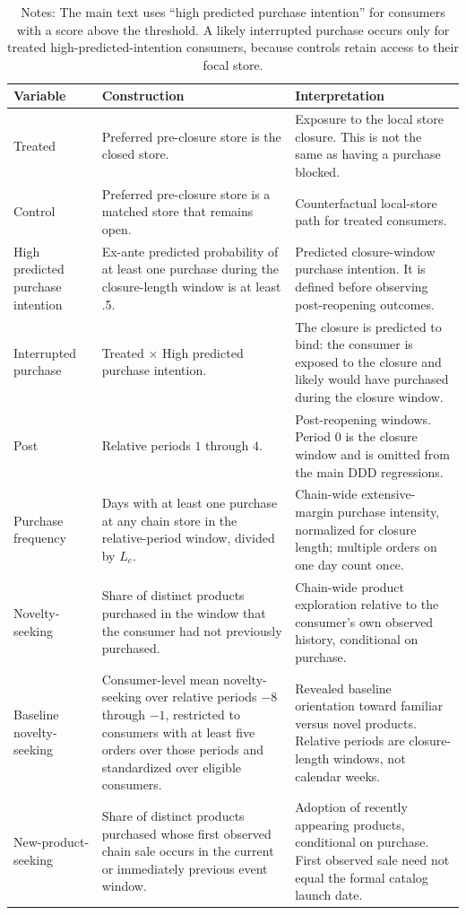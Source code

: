 \documentclass[11 pt]{article}
\newcommand\fnote[1]{\captionsetup{font=footnotesize}\caption*{#1}}
\begin{document}
\begin{table}[!ht]
\centering
\caption{Key variables in the empirical design}
\label{tab:appendix_variable_definitions}
\small
\begin{tabularx}{\textwidth}{p{4cm}p{5.5cm}X}
\toprule
Variable & Construction & Interpretation \\
\midrule
Treated & Preferred pre-closure store is the closed store. & Exposure to the local store closure. This is not the same as having a purchase blocked. \\
Control & Preferred pre-closure store is a matched store that remains open. & Counterfactual local-store path for treated consumers. \\
High predicted purchase intention & Ex-ante predicted probability of at least one purchase during the closure-length window is at least .5. & Predicted closure-window purchase intention. It is defined before observing post-reopening outcomes. \\
Interrupted purchase & Treated $\times$ High predicted purchase intention. & The closure is predicted to bind: the consumer is exposed to the closure and likely would have purchased during the closure window. \\
Post & Relative periods $1$ through $4$. & Post-reopening windows. Period $0$ is the closure window and is omitted from the main DDD regressions. \\
Purchase frequency & Days with at least one purchase at any chain store in the relative-period window, divided by $L_e$. & Chain-wide extensive-margin purchase intensity, normalized for closure length; multiple orders on one day count once. \\
Novelty-seeking & Share of distinct products purchased in the window that the consumer had not previously purchased. & Chain-wide product exploration relative to the consumer's own observed history, conditional on purchase. \\
Baseline novelty-seeking & Consumer-level mean novelty-seeking over relative periods $-8$ through $-1$, restricted to consumers with at least five orders over those periods and standardized over eligible consumers. & Revealed baseline orientation toward familiar versus novel products. Relative periods are closure-length windows, not calendar weeks. \\
New-product-seeking & Share of distinct products purchased whose first observed chain sale occurs in the current or immediately previous event window. & Adoption of recently appearing products, conditional on purchase. First observed sale need not equal the formal catalog launch date. \\
\bottomrule
\end{tabularx}
\vspace{1mm}
\fnote{Notes: The main text uses ``high predicted purchase intention'' for consumers with a score above the threshold. A likely interrupted purchase occurs only for treated high-predicted-intention consumers, because controls retain access to their focal store.}
\end{table}
\end{document}
